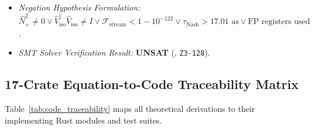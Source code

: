 \documentclass[11pt,onecolumn]{article}
\begin{document}
\begin{enumerate}
\begin{itemize}
        \item \emph{Negation Hypothesis Formulation:} $\hat{N}_+^2 \neq 0 \vee \hat{V}_{\text{iso}}^\dagger \hat{V}_{\text{iso}} \neq I \vee \mathcal{F}_{\text{stream}} < 1 - 10^{-122} \vee \tau_{\text{Nash}} > 17.01\text{ as} \vee \text{FP registers used}$.
        \item \emph{SMT Solver Verification Result:} \textbf{UNSAT} (, \texttt{Z3-128}).
    \end{itemize}
\end{enumerate}

\subsection{17-Crate Equation-to-Code Traceability Matrix}
Table~\ref{tab:code_traceability} maps all theoretical derivations to their implementing Rust modules and test suites.
\end{document}
